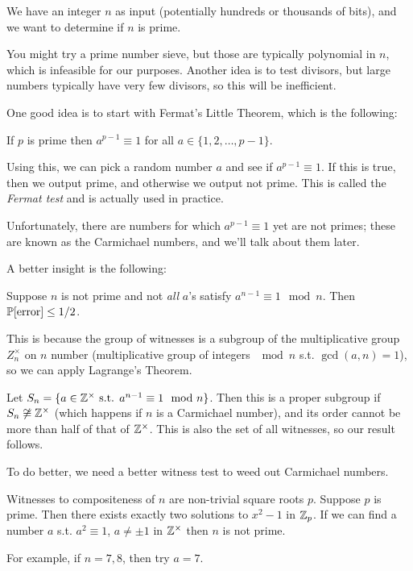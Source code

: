 \documentclass[11 pt]{scrartcl}
\begin{document}
\begin{example}
    We have an integer $n$ as input (potentially hundreds or thousands of bits), and we want to determine if $n$ is prime. 
    
    You might try a prime number sieve, but those are typically polynomial in $n$, which is infeasible for our purposes. Another idea is to test divisors, but large numbers typically have very few divisors, so this will be inefficient. 

    One good idea is to start with Fermat's Little Theorem, which is the following: 
    \begin{theorem}
        If $p$ is prime then $a^{p-1} \equiv 1$ for all $a \in \{1, 2, \dots, p-1\}$.
    \end{theorem}
    Using this, we can pick a random number $a$ and see if $a^{p-1} \equiv 1$. If this is true, then we output prime, and otherwise we output not prime. This is called the \emph{Fermat test} and is actually used in practice. 

    Unfortunately, there are numbers for which $a^{p-1}\equiv 1$ yet are not primes; these are known as the Carmichael numbers, and we'll talk about them later. 

    A better insight is the following:
    \begin{fact}
        Suppose $n$ is not prime and not \emph{all} $a$'s satisfy $a^{n-1} \equiv 1 \mod n$. Then $\mathbb P[\text{error}] \leq 1/2$. 
    \end{fact}
    This is because the group of witnesses is a subgroup of the multiplicative group $Z_n^\times$ on $n$ number (multiplicative group of integers $\mod n$ s.t. $\gcd(a,n) = 1$), so we can apply Lagrange's Theorem. 

    Let $S_n = \{a\in \mathbb Z^\times \text{ s.t. } a^{n-1}\equiv 1 \mod n\}$. Then this is a proper subgroup if $S_n \not\cong \mathbb Z^\times$ (which happens if $n$ is a Carmichael number), and its order cannot be more than half of that of $\mathbb Z^\times$. This is also the set of all witnesses, so our result follows.  

    To do better, we need a better witness test to weed out Carmichael numbers. 
    \begin{theorem}
        Witnesses to compositeness of $n$ are non-trivial square roots $p$. Suppose $p$ is prime. Then there exists exactly two solutions to $x^2-1$ in $\mathbb Z_p$. If we can find a number $a$ s.t. $a^2 \equiv 1 $, $a\not= \pm 1$ in $\mathbb Z^\times$ then $n$ is not prime. 
    \end{theorem}
    For example, if $n = 7,8$, then try $a = 7$.  


\end{example}
\end{document}

